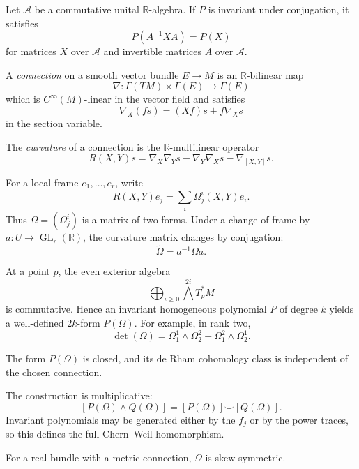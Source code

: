 \begin{proposition}
\label{at-proposition-invariants-algebra}
Let $\mathcal{A}$ be a commutative unital
$\mathbb{R}$-algebra.  If $P$ is invariant
under conjugation, it satisfies
$$
P(A^{-1}XA)=P(X)
$$
for matrices $X$ over $\mathcal{A}$ and
invertible matrices $A$ over $\mathcal{A}$.
\end{proposition}

\begin{definition}
\label{at-definition-bundle-connection}
A \emph{connection} on a smooth vector bundle
$E\longrightarrow M$ is an
$\mathbb{R}$-bilinear map
$$
\nabla:\Gamma(TM)\times\Gamma(E)
\longrightarrow\Gamma(E)
$$
which is $C^\infty(M)$-linear in the vector
field and satisfies
$$
\nabla_X(fs)=(Xf)s+f\nabla_Xs
$$
in the section variable.
\end{definition}

\begin{definition}
\label{at-definition-bundle-curvature}
The \emph{curvature} of a connection is the
$\mathbb{R}$-multilinear operator
$$
R(X,Y)s=
\nabla_X\nabla_Ys-
\nabla_Y\nabla_Xs-
\nabla_{[X,Y]}s.
$$
\end{definition}

For a local frame $e_1,\ldots,e_r$, write
$$
R(X,Y)e_j
=\sum_i\Omega^i_j(X,Y)e_i.
$$
Thus $\Omega=(\Omega^i_j)$ is a matrix of
two-forms.  Under a change of frame by
$a:U\longrightarrow\operatorname{GL}_r(
\mathbb{R})$, the curvature matrix changes
by conjugation:
$$
\widetilde\Omega=a^{-1}\Omega a.
$$

At a point $p$, the even exterior algebra
$$
\bigoplus_{i\geq0}
\bigwedge^{2i}T_p^*M
$$
is commutative.  Hence an invariant
homogeneous polynomial $P$ of degree $k$
yields a well-defined $2k$-form
$P(\Omega)$.  For example, in rank two,
$$
\det(\Omega)=
\Omega^1_1\wedge\Omega^2_2-
\Omega^2_1\wedge\Omega^1_2.
$$

\begin{theorem}
\label{at-theorem-chern-weil}
The form $P(\Omega)$ is closed, and its de
Rham cohomology class is independent of the
chosen connection.
\end{theorem}

The construction is multiplicative:
$$
[P(\Omega)\wedge Q(\Omega)]
=[P(\Omega)]\smile[Q(\Omega)].
$$
Invariant polynomials may be generated either
by the $f_j$ or by the power traces, so this
defines the full Chern--Weil homomorphism.

For a real bundle with a metric connection,
$\Omega$ is skew symmetric.

